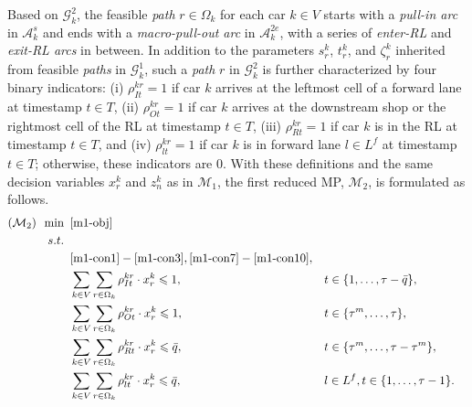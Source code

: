 \documentclass[12pt]{article}
\newcounter{RMPone}
\begin{document}
Based on $\mathcal{G}^2_k$, the feasible \textit{path} $r\in \Omega_k$ for each car $k\in V$ starts with a \textit{pull-in arc} in $\mathcal{A}^s_k$ and ends with a \textit{macro-pull-out arc} in $\mathcal{A}^{2e}_k$, with a series of \textit{enter-RL} and \textit{exit-RL arcs} in between. In addition to the parameters $s^k_r$, $t^k_r$, and $\zeta^k_r$ inherited from feasible \textit{paths} in $\mathcal{G}^1_k$, such a \textit{path} $r$ in $\mathcal{G}^2_k$ is further characterized by four binary indicators: \textup{(i)} $\rho^{kr}_{It}=1$ if car $k$ arrives at the leftmost cell of a forward lane at timestamp $t\in T$, \textup{(ii)} $\rho^{kr}_{Ot}=1$ if car $k$ arrives at the downstream shop or the rightmost cell of the RL at timestamp $t\in T$, \textup{(iii)} $\rho^{kr}_{Rt}=1$ if car $k$ is in the RL at timestamp $t\in T$, and \textup{(iv)} $\rho^{kr}_{lt}=1$ if car $k$ is in forward lane $l\in L^f$ at timestamp $t\in T$; otherwise, these indicators are 0. With these definitions and the same decision variables $x^k_r$ and $z^k_n$ as in $\mathcal{M}_{1}$, the first reduced MP, $\mathcal{M}_2$, is formulated as follows.
\begin{subequations}\label{RMP2}
\begin{align}
  (\mathcal{M}_2)\,\ \min&\,\ \eqref{m1-obj} \nonumber \\%
        s.t.&\quad \nonumber \\
        &\,\ \eqref{m1-con1}-\eqref{m1-con3}, \eqref{m1-con7}-\eqref{m1-con10}, \nonumber \\%
        \label{m2-con2}&\,\ \sum_{k\in V}{\sum_{r\in \Omega_k}{\rho^{kr}_{It} \cdot x^k_r}}\leqslant 1, &&t\in \{1,\dots,\tau-\bar{q}\}, \\
        \label{m2-con3}&\,\ \sum_{k\in V}{\sum_{r\in \Omega_k}{\rho^{kr}_{Ot} \cdot x^k_r}}\leqslant 1, &&t\in \{\tau^m,\dots,\tau\}, \\%
        \label{m2-con4}&\,\ \sum_{k\in V}{\sum_{r\in \Omega_k}{\rho^{kr}_{Rt}\cdot x^k_r}}\leqslant \bar{q}, &&t\in \{\tau^m,\dots,\tau-\tau^m\}, \\
        \label{m2-con5}&\,\ \sum_{k\in V}{\sum_{r\in \Omega_k}{\rho^{kr}_{lt}\cdot x^k_r}}\leqslant \bar{q}, && l\in L^f, t\in \{1,\dots,\tau-1\}.
\end{align}
\end{subequations}
\end{document}
